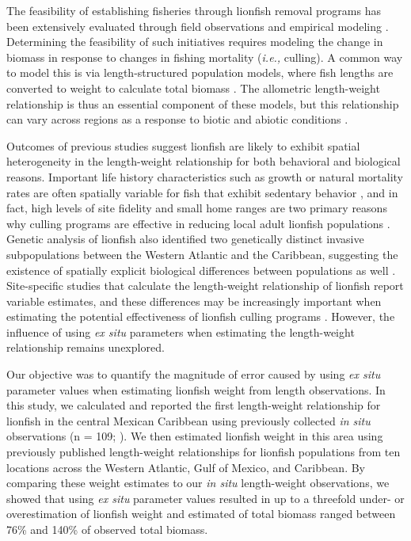 \documentclass[fleqn,10pt,lineno]{wlpeerj} %
\begin{document}
The feasibility of establishing fisheries through lionfish removal
programs has been extensively evaluated through field observations and
empirical modeling
\citep{barbour_2011,morris_2011,deleon_2013,johnston_2015,sandel_2015,usseglio_2017}.
Determining the feasibility of such initiatives requires modeling the
change in biomass in response to changes in fishing mortality
(\emph{i.e.,} culling). A common way to model this is via
length-structured population models, where fish lengths are converted to
weight to calculate total biomass
\citep{barbour_2011,cote_2014,andradibrown_2017}. The allometric
length-weight relationship is thus an essential component of these
models, but this relationship can vary across regions as a response to
biotic and abiotic conditions \citep{johnson_2016}.

Outcomes of previous studies suggest lionfish are likely to exhibit
spatial heterogeneity in the length-weight relationship for both
behavioral and biological reasons. Important life history
characteristics such as growth or natural mortality rates are often
spatially variable for fish that exhibit sedentary behavior
\citep{gunderson_2008,hutchinson_2008,wilson_2012,guan_2013}, and in
fact, high levels of site fidelity and small home ranges are two primary
reasons why culling programs are effective in reducing local adult
lionfish populations
\citep{Fishelson_1997,kochzius_2005,jud_2012,cote_2014}. Genetic
analysis of lionfish also identified two genetically distinct invasive
subpopulations between the Western Atlantic and the Caribbean,
suggesting the existence of spatially explicit biological differences
between populations as well \citep{betancurr_2011}. Site-specific
studies that calculate the length-weight relationship of lionfish report
variable estimates, and these differences may be increasingly important
when estimating the potential effectiveness of lionfish culling programs
\citep{barbour_2011,morris_2011,cote_2014,johnston_2015}. However, the
influence of using \emph{ex situ} parameters when estimating the
length-weight relationship remains unexplored.

Our objective was to quantify the magnitude of error caused by using
\emph{ex situ} parameter values when estimating lionfish weight from
length observations. In this study, we calculated and reported the first
length-weight relationship for lionfish in the central Mexican Caribbean
using previously collected \emph{in situ} observations (n = 109;
\citet{villaseorderbez_2014}). We then estimated lionfish weight in this
area using previously published length-weight relationships for lionfish
populations from ten locations across the Western Atlantic, Gulf of
Mexico, and Caribbean. By comparing these weight estimates to our
\emph{in situ} length-weight observations, we showed that using \emph{ex
situ} parameter values resulted in up to a threefold under- or
overestimation of lionfish weight and estimated of total biomass ranged
between 76\% and 140\% of observed total biomass.
\end{document}
